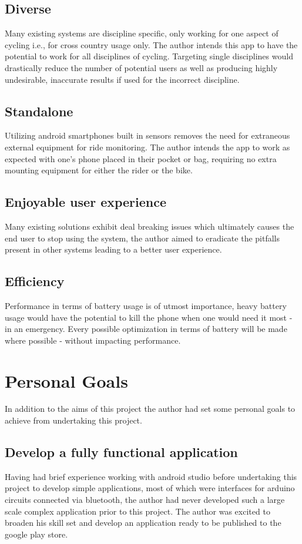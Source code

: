 \subsection*{Diverse}

Many existing systems are discipline specific, only working for one aspect of cycling i.e., for cross country usage only. The author intends this app to have the potential to work for all disciplines of cycling. Targeting single disciplines would drastically reduce the number of potential users as well as producing highly undesirable, inaccurate results if used for the incorrect discipline.

\subsection*{Standalone}

Utilizing android smartphones built in sensors removes the need for extraneous external equipment for ride monitoring.  The author intends the app to work as expected with one's phone placed in their pocket or bag, requiring no extra mounting equipment for either the rider or the bike.


\subsection*{Enjoyable user experience}
Many existing solutions exhibit deal breaking issues which ultimately causes the end user to stop using the system, the author aimed to eradicate the pitfalls present in other systems leading to a better user experience. 


\subsection*{Efficiency}
Performance in terms of battery usage is of utmost importance, heavy battery usage would have the potential to kill the phone when one would need it most - in an emergency. Every possible optimization in terms of battery will be made where possible - without impacting performance.

\section{Personal Goals}
In addition to the aims of this project the author had set some personal goals to achieve from undertaking this project.


\subsection*{Develop a fully functional application}
Having had brief experience working with android studio before undertaking this project to develop simple applications, most of which were interfaces for arduino circuits connected via bluetooth, the author had never developed such a large scale complex application prior to this project. The author was excited to broaden his skill set and develop an application ready to be published to the google play store. 

